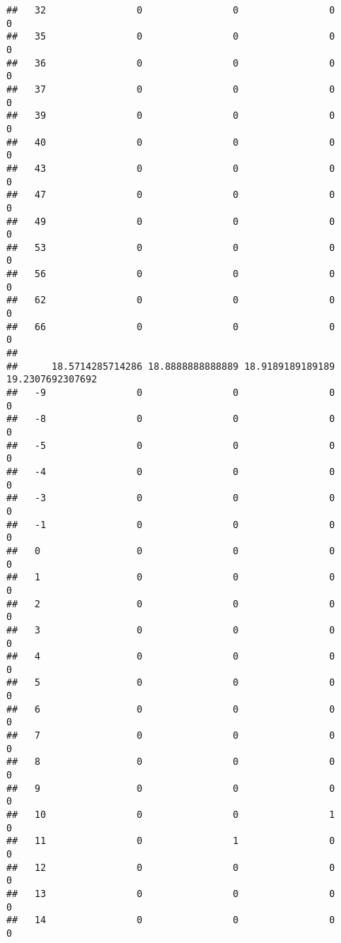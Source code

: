 \documentclass[]{article}
\begin{document}
\begin{verbatim}
##   32                0                0                0                0
##   35                0                0                0                0
##   36                0                0                0                0
##   37                0                0                0                0
##   39                0                0                0                0
##   40                0                0                0                0
##   43                0                0                0                0
##   47                0                0                0                0
##   49                0                0                0                0
##   53                0                0                0                0
##   56                0                0                0                0
##   62                0                0                0                0
##   66                0                0                0                0
##     
##      18.5714285714286 18.8888888888889 18.9189189189189 19.2307692307692
##   -9                0                0                0                0
##   -8                0                0                0                0
##   -5                0                0                0                0
##   -4                0                0                0                0
##   -3                0                0                0                0
##   -1                0                0                0                0
##   0                 0                0                0                0
##   1                 0                0                0                0
##   2                 0                0                0                0
##   3                 0                0                0                0
##   4                 0                0                0                0
##   5                 0                0                0                0
##   6                 0                0                0                0
##   7                 0                0                0                0
##   8                 0                0                0                0
##   9                 0                0                0                0
##   10                0                0                1                0
##   11                0                1                0                0
##   12                0                0                0                0
##   13                0                0                0                0
##   14                0                0                0                0

\end{verbatim}
\end{document}
